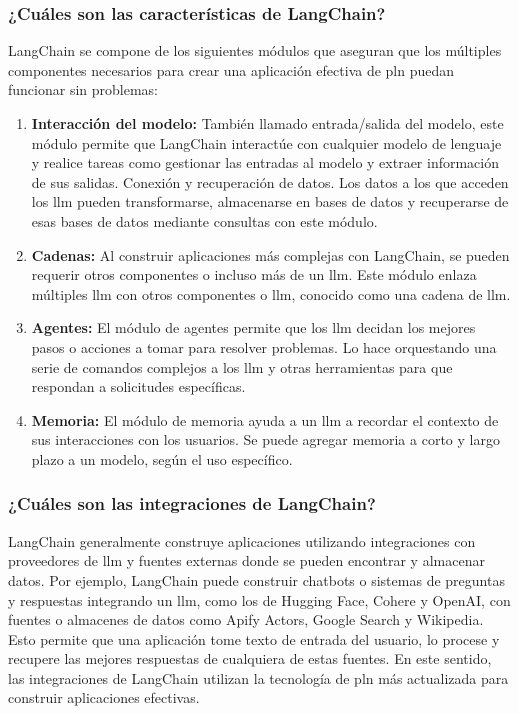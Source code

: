 \subsubsection{¿Cuáles son las características de LangChain?}
LangChain se compone de los siguientes módulos que aseguran que los múltiples componentes necesarios para crear una aplicación efectiva de \acrshort{pln} puedan funcionar sin problemas:
\begin{enumerate}

\item \textbf{Interacción del modelo:} También llamado entrada/salida del modelo, este módulo permite que LangChain interactúe con cualquier modelo de lenguaje y realice tareas como gestionar las entradas al modelo y extraer información de sus salidas.
Conexión y recuperación de datos. Los datos a los que acceden los \acrshort{llm} pueden transformarse, almacenarse en bases de datos y recuperarse de esas bases de datos mediante consultas con este módulo.
\item \textbf{Cadenas:} Al construir aplicaciones más complejas con LangChain, se pueden requerir otros componentes o incluso más de un \acrshort{llm}. Este módulo enlaza múltiples \acrshort{llm} con otros componentes o \acrshort{llm}, conocido como una cadena de \acrshort{llm}.
\item \textbf{Agentes:} El módulo de agentes permite que los \acrshort{llm} decidan los mejores pasos o acciones a tomar para resolver problemas. Lo hace orquestando una serie de comandos complejos a los \acrshort{llm} y otras herramientas para que respondan a solicitudes específicas.
\item \textbf{Memoria:} El módulo de memoria ayuda a un \acrshort{llm} a recordar el contexto de sus interacciones con los usuarios. Se puede agregar memoria a corto y largo plazo a un modelo, según el uso específico.
\end{enumerate}


\subsubsection{¿Cuáles son las integraciones de LangChain?}
LangChain generalmente construye aplicaciones utilizando integraciones con proveedores de \acrshort{llm} y fuentes externas donde se pueden encontrar y almacenar datos. Por ejemplo, LangChain puede construir chatbots o sistemas de preguntas y respuestas integrando un \acrshort{llm}, como los de Hugging Face, Cohere y OpenAI, con fuentes o almacenes de datos como Apify Actors, Google Search y Wikipedia. Esto permite que una aplicación tome texto de entrada del usuario, lo procese y recupere las mejores respuestas de cualquiera de estas fuentes. En este sentido, las integraciones de LangChain utilizan la tecnología de \acrlong{pln} más actualizada para construir aplicaciones efectivas.

